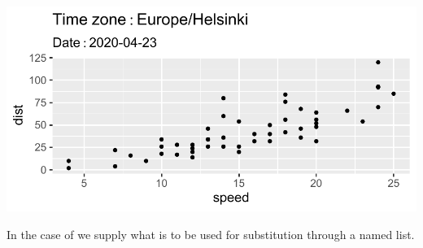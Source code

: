 \documentclass[krantz2]{krantz}\usepackage{knitr}
\begin{document}
\begin{knitrout}\footnotesize
{}\color{fgcolor}\begin{kframe}
\begin{alltt}
  \hlopt{+}
  \hlstd{()} \hlopt{+}
  \hlstd{(} \hlstd{=} \hlopt{~}\hlopt{:} \hlstd{(}\hlstd{())),}
        \hlstd{=} \hlopt{:} \hlstd{(}\hlstd{(}\hlstd{())))}
       \hlstd{)}
\end{alltt}
\end{kframe}

{\centering \includegraphics[width=.7\textwidth]{figure/pos-expr-bquote-01-1}

}



\end{knitrout}

In the case of  we supply what is to be used for substitution through a named list.
\end{document}
